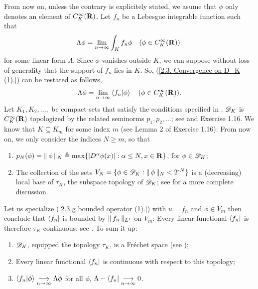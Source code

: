 From now on, unless the contrary is explicitely stated, %
we asume that $\phi$ only denotes an element of $C_K^\infty(\R)$. 
Let $f_n$ be a Lebesgue integrable function such that %
%
  \begin{align}\label{2.3. Convergence on D_K (1).}
    \Lambda \phi = \underset{n \to \infty}{\lim} 
      \int_{K} f_n\phi 
      \quad (\phi \in C_K^\infty(\R)).
  \end{align}
%
for some linear form $\Lambda$. %
%
Since $\phi$ vanishes outside $K$, we can suppose without loss of generality %
that the support of $f_n$ lies in $K$. So, %
%
  (\ref{2.3. Convergence on D_K (1).}) %
% 
can be restated as follows, 
%
  \begin{align}
    \Lambda \phi = \underset{n \to \infty}{\lim} 
      \bra{f_n}\ket{\phi} 
      \quad (\phi \in C_K^\infty(\R)).
  \end{align}
%
Let $K_1, K_2, \dots, $ be compact sets that satisfy the conditions 
specified in . %
$\D_K$ is $C_K^\infty(\R)$ topologized by the related seminorms %
%
  $p_1, p_2, \dots$; see  and Exercise 1.16.
%
We know that $K\subseteq K_m$ for some index $m$ %
(see Lemma 2 of Exercise 1.16): From now on, we only consider the indices 
$N \geq m$, so that%
%
  \renewcommand{\labelenumi}{(\alph{enumi})}%
  \begin{enumerate}
    \item{
      $p_N(\phi) = \norm{N}{\phi} \Def \max 
      \set{\lvert D^{\alpha}\phi(x) \rvert}{\alpha \leq N, x \in \R}$, %
      for $\phi \in \D_K$;
    }
    \item{
      The collection of the sets %
      $V_N = \set{ \phi \in \D_K}{ \norm{N}{\phi} < 2^{\minus N}}$ %
      is a (decreasing) local base of $\tau_K$, the subspace topology of $\D_K$; %
      see  for a more complete discussion.
    }
  \end{enumerate}
  \renewcommand{\labelenumi}{(\roman{enumi})}
%
Let us specialize (\ref{2.3  g  bounded operator (1).}) with %
%
  $u=f_n$ and $ \phi \in V_m$ %
%
then conclude that $\bra{f_n}$ is bounded by $\norm{L^1}{f_n}$ on $V_m$: %
Every linear functional $\bra{f_n}$ is therefore $\tau_K$-continuous; see %
%
  . \newline\newline\noindent
%
To sum it up: %
%
  \begin{enumerate}
    \item{$\D_K$, equipped the topology $\tau_K$, is a Fréchet space %
      (see )};
    \item{Every linear functional $\bra{f_n}$ is continuous %
      with respect to this topology;}
    \item{
      $\bra{f_n}\ket{\phi} \tendsto{n}{\infty} \Lambda \phi$ for all $\phi$, 
        \ie 
      $ \Lambda-\bra{f_n} \tendsto{n}{\infty}0$.
    }
  \end{enumerate}
